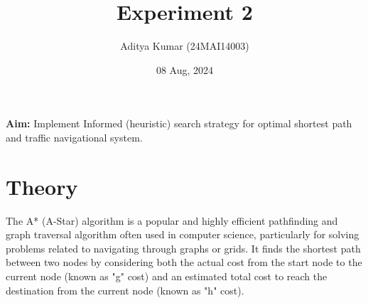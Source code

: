 \documentclass[12pt]{fphw}
\title{Experiment 2}
\author{Aditya Kumar (24MAI14003)\\}
\date{08 Aug, 2024}
\institute{Chandigarh University\\Master of Engineeing---Artificial Intelligence}
\begin{document}
\maketitle

\section*{}
\begin{problem}
  \textbf{Aim: }Implement Informed (heuristic) search strategy for optimal shortest path and traffic navigational system. 
\end{problem}
\section{Theory}
The A* (A-Star) algorithm is a popular and highly efficient pathfinding and graph traversal 
algorithm often used in computer science, particularly for solving problems related to navigating 
through graphs or grids. It finds the shortest path between two nodes by considering both the actual 
cost from the start node to the current node (known as "g" cost) and an estimated total cost to 
reach the destination from the current node (known as "h" cost).
\end{document}
